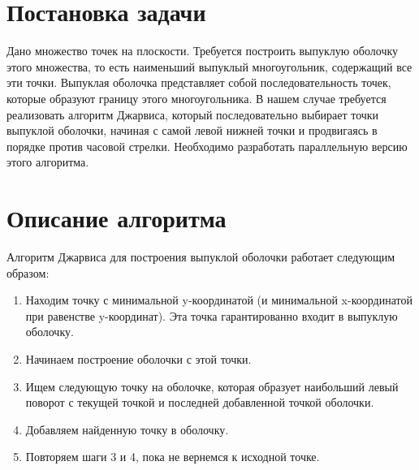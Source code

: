 \documentclass[12pt]{article}
\begin{document}
\section{Постановка задачи}

Дано множество точек на плоскости. Требуется построить выпуклую оболочку этого множества, то есть наименьший выпуклый многоугольник, содержащий все эти точки. Выпуклая оболочка представляет собой последовательность точек, которые образуют границу этого многоугольника. В нашем случае требуется реализовать алгоритм Джарвиса, который последовательно выбирает точки выпуклой оболочки, начиная с самой левой нижней точки и продвигаясь в порядке против часовой стрелки. Необходимо разработать параллельную версию этого алгоритма.

\section{Описание алгоритма}

Алгоритм Джарвиса для построения выпуклой оболочки работает следующим образом:
\begin{enumerate}
    \item Находим точку с минимальной y-координатой (и минимальной x-координатой при равенстве y-координат). Эта точка гарантированно входит в выпуклую оболочку.
    \item Начинаем построение оболочки с этой точки. 
    \item Ищем следующую точку на оболочке, которая образует наибольший левый поворот с текущей точкой и последней добавленной точкой оболочки.
    \item Добавляем найденную точку в оболочку.
    \item  Повторяем шаги 3 и 4, пока не вернемся к исходной точке.
\end{enumerate}
\end{document}

